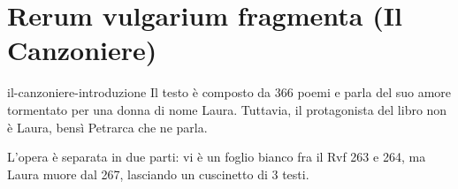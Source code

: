\documentclass[preview]{standalone}
\begin{document}
\genpage

\section{Rerum vulgarium fragmenta (Il Canzoniere)}

\begin{snippet}{il-canzoniere-introduzione}
    Il testo è composto da 366 poemi e parla del suo amore tormentato per una donna di nome Laura.
    Tuttavia, il protagonista del libro non è Laura, bensì Petrarca che ne parla.
    
    L'opera è separata in due parti: vi è un foglio bianco fra il Rvf 263 e 264,
    ma Laura muore dal 267, lasciando un cuscinetto di 3 testi.
\end{snippet}
\end{document}
